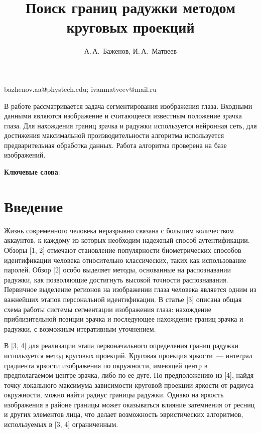 \documentclass[12pt, twoside]{article}
\begin{document}
\title
    {Поиск границ радужки методом круговых проекций} %
\author
    {А.\,А.~Баженов, И.\,А.~Матвеев} %
\email
    {bazhenov.aa@phystech.edu; ivanmatveev@mail.ru}
\abstract
    {В работе рассматривается задача сегментирования изображения глаза. Входными данными являются изображение и считающееся известным положение зрачка глаза. Для нахождения границ зрачка и радужки используется нейронная сеть, для достижения максимальной производительности алгоритма используется предварительная обработка данных. Работа алгоритма проверена на базе изображений.
	
\bigskip
\noindent
\textbf{Ключевые слова}: \emph {}

}


\maketitle
\linenumbers

\section{Введение}
Жизнь современного человека неразрывно связана с большим количеством аккаунтов, к каждому из которых необходим надежный способ аутентификации. Обзоры [1, 2] отмечают становление популярности биометрических способов идентификации человека относительно классических, таких как использование паролей. Обзор [2] особо выделяет методы, основанные на распознавании радужки, как позволяющие достигнуть высокой точности распознавания. Первичное выделение регионов на изображении глаза человека является одним из важнейших этапов персональной идентификации. В статье [3] описана общая схема работы системы сегментации изображения глаза: нахождение приблизительной позиции зрачка и последующее нахождение границ зрачка и радужки, с возможным итеративным уточнением.

В [3, 4] для реализации этапа первоначального определения границ радужки  используется метод круговых проекций. Круговая проекция яркости~--- интеграл градиента яркости изображения по окружности, имеющей центр в предполагаемом центре зрачка, либо по ее дуге. По предположению из [4], найдя точку локального максимума зависимости круговой проекции яркости от радиуса окружности, можно найти радиус границы радужки. Однако на яркость изображения в районе границы может оказываться влияние затемнения от ресниц и других элементов лица, что делает возможность эвристических алгоритмов, используемых в [3, 4] ограниченным.
\end{document}
